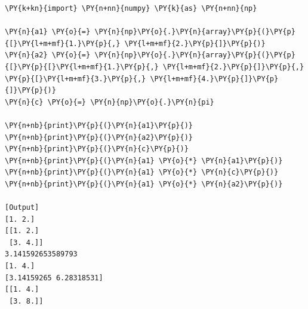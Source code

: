 \begin{Verbatim}[label=\makebox{\url{https://github.com/lucabaldini/cmepda/tree/master/slides/latex/snippets/numpy\_arrays\_broadcasting.py}},commandchars=\\\{\}]
\PY{k+kn}{import} \PY{n+nn}{numpy} \PY{k}{as} \PY{n+nn}{np}

\PY{n}{a1} \PY{o}{=} \PY{n}{np}\PY{o}{.}\PY{n}{array}\PY{p}{(}\PY{p}{[}\PY{l+m+mf}{1.}\PY{p}{,} \PY{l+m+mf}{2.}\PY{p}{]}\PY{p}{)}
\PY{n}{a2} \PY{o}{=} \PY{n}{np}\PY{o}{.}\PY{n}{array}\PY{p}{(}\PY{p}{[}\PY{p}{[}\PY{l+m+mf}{1.}\PY{p}{,} \PY{l+m+mf}{2.}\PY{p}{]}\PY{p}{,} \PY{p}{[}\PY{l+m+mf}{3.}\PY{p}{,} \PY{l+m+mf}{4.}\PY{p}{]}\PY{p}{]}\PY{p}{)}
\PY{n}{c} \PY{o}{=} \PY{n}{np}\PY{o}{.}\PY{n}{pi}

\PY{n+nb}{print}\PY{p}{(}\PY{n}{a1}\PY{p}{)}
\PY{n+nb}{print}\PY{p}{(}\PY{n}{a2}\PY{p}{)}
\PY{n+nb}{print}\PY{p}{(}\PY{n}{c}\PY{p}{)}
\PY{n+nb}{print}\PY{p}{(}\PY{n}{a1} \PY{o}{*} \PY{n}{a1}\PY{p}{)}
\PY{n+nb}{print}\PY{p}{(}\PY{n}{a1} \PY{o}{*} \PY{n}{c}\PY{p}{)}
\PY{n+nb}{print}\PY{p}{(}\PY{n}{a1} \PY{o}{*} \PY{n}{a2}\PY{p}{)}

[Output]
[1. 2.]
[[1. 2.]
 [3. 4.]]
3.141592653589793
[1. 4.]
[3.14159265 6.28318531]
[[1. 4.]
 [3. 8.]]
\end{Verbatim}
